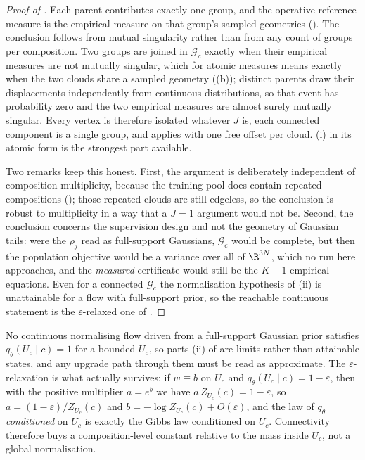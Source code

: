 \begin{proof}[Proof of ]
Each parent contributes exactly one group, and the operative reference measure is
the empirical measure on that group's sampled geometries ().
The conclusion follows from mutual singularity rather than from any count of groups
per composition. Two groups are joined in $\mathcal{G}_c$ exactly when their
empirical measures are not mutually singular, which for atomic measures means
exactly when the two clouds share a sampled geometry ((b));
distinct parents draw their displacements independently from continuous
distributions, so that event has probability zero and the two empirical measures
are almost surely mutually singular.
Every vertex is therefore isolated whatever $J$ is, each connected component is a
single group, and  applies with one free offset per cloud.
(i) in its atomic form is the strongest part available.

Two remarks keep this honest. First, the argument is deliberately independent of
composition multiplicity, because the training pool does contain repeated
compositions (); those repeated clouds are still edgeless, so the
conclusion is robust to multiplicity in a way that a $J = 1$ argument would not be.
Second, the conclusion concerns the supervision design and not the geometry of
Gaussian tails: were the $\rho_j$ read as full-support Gaussians, $\mathcal{G}_c$
would be complete, but then the population objective would be a variance over all of
$\R^{3N}$, which no run here approaches, and the \emph{measured} certificate would
still be the $K-1$ empirical equations. Even for a connected $\mathcal{G}_c$ the
normalisation hypothesis of (ii) is unattainable for a flow with
full-support prior, so the reachable continuous statement is the
$\varepsilon$-relaxed one of .
\end{proof}

\begin{remark}
\label{rem:epsilon}
No continuous normalising flow driven from a full-support Gaussian prior satisfies
$q_\theta(U_c \mid c) = 1$ for a bounded $U_c$, so parts (ii) of
 are limits rather than attainable states, and any upgrade
path through them must be read as approximate. The $\varepsilon$-relaxation is what
actually survives: if $w \equiv b$ on $U_c$ and $q_\theta(U_c \mid c) = 1 - \varepsilon$,
then with the positive multiplier $a = e^{b}$ we have $a\,Z_{U_c}(c) = 1-\varepsilon$, so
$a = (1-\varepsilon)/Z_{U_c}(c)$ and $b = -\log Z_{U_c}(c) + O(\varepsilon)$, and
the law of $q_\theta$ \emph{conditioned} on $U_c$ is exactly the Gibbs law conditioned on
$U_c$. Connectivity therefore buys a composition-level constant relative to the mass
inside $U_c$, not a global normalisation.
\end{remark}

